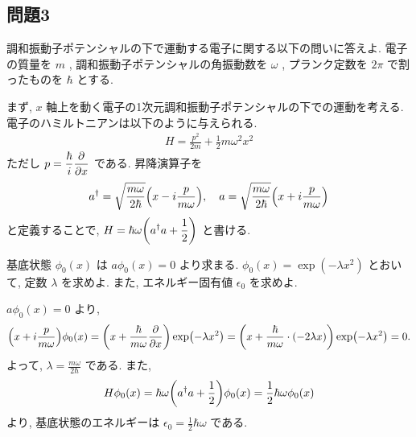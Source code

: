 \documentclass[../../ou-physics-exam.tex]{subfiles}
\begin{document}
\subsection*{問題3}
調和振動子ポテンシャルの下で運動する電子に関する以下の問いに答えよ. 
電子の質量を $ m $ , 調和振動子ポテンシャルの角振動数を $ \omega $ , プランク定数を $ 2 \pi $ で割ったものを $ \hbar $ とする.

まず, $ x $ 軸上を動く電子の1次元調和振動子ポテンシャルの下での運動を考える. 
電子のハミルトニアンは以下のように与えられる.
\begin{align*}
    H = \frac{p^2}{2m} + \frac{1}{2} m \omega^2 x^2
\end{align*}
ただし $ \displaystyle p = \frac{\hbar}{i} \pdv{x} $ である. 
昇降演算子を
\begin{align*}
    a^{\dagger} = \sqrt{\frac{m \omega}{2 \hbar}} \qty(x - i \frac{p}{m \omega}) , \quad a = \sqrt{\frac{m \omega}{2 \hbar}} \qty(x + i \frac{p}{m \omega})
\end{align*}
と定義することで, $ \displaystyle H = \hbar \omega \qty(a^{\dagger} a + \frac{1}{2}) $ と書ける.

基底状態 $ \phi_0 (x) $ は $ a \phi_0 (x) = 0 $ より求まる. 
$ \phi_0 (x) = \exp (- \lambda x^2) $ とおいて, 定数 $ \lambda $ を求めよ. 
また, エネルギー固有値 $ \epsilon_0 $ を求めよ.
\begin{answer}
    $ a \phi_0 (x) = 0 $ より,
    \begin{align*}
        \qty(x + i \frac{p}{m \omega}) \phi_0 (x) = \qty(x + \frac{\hbar}{m \omega} \pdv{x}) \exp (- \lambda x^2) = \qty(x + \frac{\hbar}{m \omega} \cdot (-2 \lambda x)) \exp (- \lambda x^2) = 0.
    \end{align*}
    よって, $ \displaystyle \lambda = \frac{m \omega}{2 \hbar} $ である. 
    また,
    \begin{align*}
        H \phi_0 (x) = \hbar \omega \qty(a^{\dagger} a + \frac{1}{2}) \phi_0 (x) = \frac{1}{2} \hbar \omega \phi_0 (x)
    \end{align*}
    より, 基底状態のエネルギーは $ \displaystyle \epsilon_0 = \frac{1}{2} \hbar \omega $ である.
\end{answer}
\end{document}
